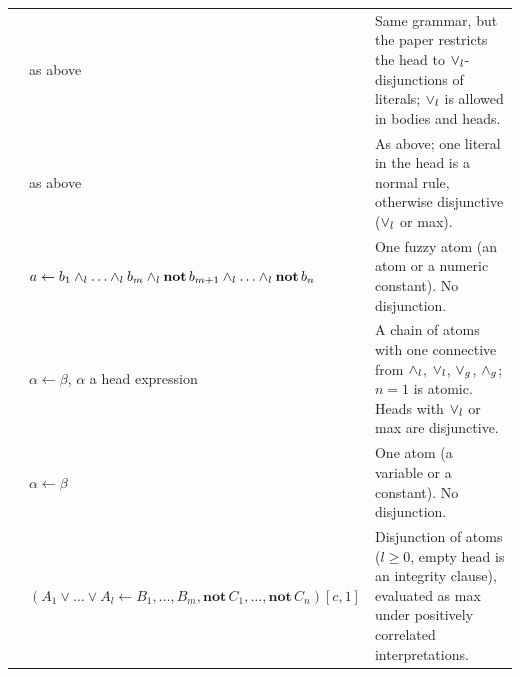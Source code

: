 {\begin{longtable}{@{}p{}p{}p{}@{}}
            \cite{MushthofaSD15}                  & as above                                                                                                                                                & Same grammar, but the paper restricts the head to $\lor_l$-disjunctions of literals; $\lor_l$ is allowed in bodies and heads.                                                                                                   \\
            \cite{MushthofaSD20}                  & as above                                                                                                                                                & As above; one literal in the head is a normal rule, otherwise disjunctive ($\lor_l$ or max).                                                                                                                                      \\
            \cite{AlvianoP13}                     & $a\leftarrow b_1\flpand_l\dots\flpand_l b_m\flpand_l\mathbf{not}\,b_{m+1}\flpand_l\dots\flpand_l\mathbf{not}\,b_n$                                      & One fuzzy atom (an atom or a numeric constant). No disjunction.                                                                                                                                                                     \\
            \cite{AlvianoP15}                     & $\alpha\leftarrow\beta$, $\alpha$ a head expression                                                                                                     & A chain of atoms with one connective from $\land_l$, $\lor_l$, $\lor_g$, $\land_g$; $n=1$ is atomic. Heads with $\lor_l$ or max are disjunctive.                                                                          \\
            \cite{AlvianoAP17}                    & $\alpha\leftarrow\beta$                                                                                                                                 & One atom (a variable or a constant). No disjunction.                                                                                                                                                                                \\
            \cite{Lukasiewicz01}                  & $(A_1\lor\dots\lor A_l\leftarrow B_1,\dots,B_m,\mathbf{not}\,C_1,\dots,\mathbf{not}\,C_n)[c,1]$                                                         & Disjunction of atoms ($l\geq0$, empty head is an integrity clause), evaluated as max under positively correlated interpretations.                                                                                                   \\

\end{longtable}}

